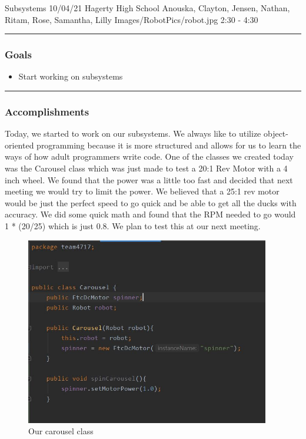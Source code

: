 \insertmeeting 
	{Subsystems} 
	{10/04/21} 
	{Hagerty High School}
	{Anouska, Clayton, Jensen, Nathan, Ritam, Rose, Samantha, Lilly}
	{Images/RobotPics/robot.jpg}
	{2:30 - 4:30}
	
\noindent\hfil\rule{\textwidth}{.4pt}\hfil
\subsubsection*{Goals}
\begin{itemize}
    \item Start working on subsystems  

\end{itemize} 

\noindent\hfil\rule{\textwidth}{.4pt}\hfil

\subsubsection*{Accomplishments}
Today, we started to work on our subsystems. We always like to utilize object-oriented programming because it is more structured and allows for us to learn the ways of how adult programmers write code. One of the classes we created today was the Carousel class which was just made to test a 20:1 Rev Motor with a 4 inch wheel. We found that the power was a little too fast and decided that next meeting we would try to limit the power. We believed that a 25:1 rev motor would be just the perfect speed to go quick and be able to get all the ducks with accuracy. We did some quick math and found that the RPM needed to go would 1 * (20/25) which is just 0.8. We plan to test this at our next meeting.


\begin{figure}[htp]
\centering
\includegraphics[width=0.95\textwidth, angle=0]{Meetings/October/10-04-21/Capture - Ritam R.JPG}
\caption{Our carousel class}
\label{fig:pic1}
\end{figure}



